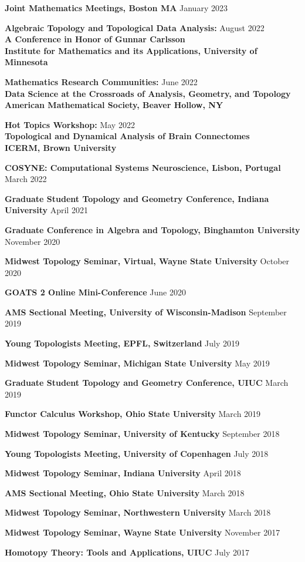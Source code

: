 \documentclass[10pt,letterpaper]{article}
\renewenvironment{itemize}{
  \begin{list}{}{
    \setlength{\leftmargin}{1.5em}
    \setlength{\itemsep}{0.25em}
    \setlength{\parskip}{0pt}
    \setlength{\parsep}{0.25em}
  }
}{
  \end{list}
}
\begin{document}
\begin{itemize}
	{\item {\bf Joint Mathematics Meetings, Boston MA} \hfill January 2023}
	
	\item {\bf Algebraic Topology and Topological Data Analysis:} \hfill August 2022\\
	{\bf A Conference in Honor of Gunnar Carlsson}\\
	{\bf Institute for Mathematics and its Applications, University of Minnesota} 
	\item {\bf Mathematics Research Communities:} \hfill June 2022\\ {\bf Data Science at the Crossroads of Analysis, Geometry, and Topology}\\
	{\bf American Mathematical Society, Beaver Hollow, NY}
	\item {\bf Hot Topics Workshop:} \hfill May 2022\\{\bf Topological and Dynamical Analysis of Brain Connectomes} \\
	{\bf ICERM, Brown University}
	\item {\bf COSYNE: Computational Systems Neuroscience, Lisbon, Portugal} \hfill March 2022
	\item {\bf Graduate Student Topology and Geometry Conference, Indiana University} \hfill April 2021
	\item {\bf Graduate Conference in Algebra and Topology, Binghamton University} \hfill November 2020
	\item {\bf Midwest Topology Seminar, Virtual, Wayne State University} \hfill October 2020
	\item {\bf GOATS 2 Online Mini-Conference} \hfill June 2020
	\item {\bf AMS Sectional Meeting, University of Wisconsin-Madison} \hfill September 2019
	\item {\bf Young Topologists Meeting, EPFL, Switzerland} \hfill July 2019
	\item {\bf Midwest Topology Seminar, Michigan State University} \hfill May 2019
	\item {\bf Graduate Student Topology and Geometry Conference, UIUC} \hfill March 2019
	\item {\bf Functor Calculus Workshop, Ohio State University} \hfill March 2019
	\item {\bf Midwest Topology Seminar, University of Kentucky} \hfill September 2018
	\item {\bf Young Topologists Meeting, University of Copenhagen} \hfill July 2018
	\item {\bf Midwest Topology Seminar, Indiana University} \hfill April 2018
	\item {\bf AMS Sectional Meeting, Ohio State University} \hfill March 2018
	\item {\bf Midwest Topology Seminar, Northwestern University} \hfill March 2018
	\item {\bf Midwest Topology Seminar, Wayne State University} \hfill November 2017
	\item {\bf Homotopy Theory: Tools and Applications, UIUC} \hfill July 2017
	
\end{itemize}
\end{document}
